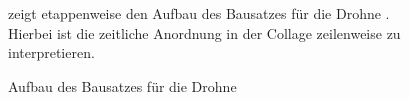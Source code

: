 \begin{figure}[ht!]
\vspace{0.25cm}
\begin{center}
\hfill
{}
\hfill
{}
\caption{Aufbau des Bausatzes für die Drohne \Clover}
\label{fig:coexBuild}
\end{center}

\vspace{0.25cm}
 zeigt etappenweise den Aufbau des Bausatzes für die Drohne \Clover. Hierbei ist die zeitliche Anordnung in der Collage zeilenweise zu interpretieren.
\end{figure}







